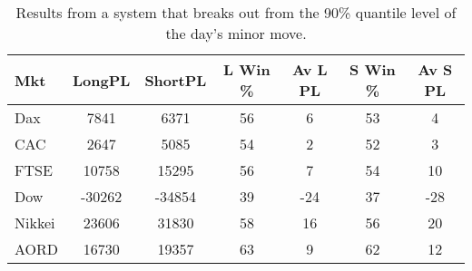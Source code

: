 \begin{table}[ht]
\centering
\caption[Results from a break out system using the day's the minor move]{Results from a system that breaks out from the 90\% quantile level of the day's minor move.} 
\label{tab:q_90_results}
\begin{tabular}{lcccccc}
  \toprule Mkt & LongPL & ShortPL & L Win \% & Av L PL & S Win \% & Av S PL \\ 
  \midrule Dax & 7841 & 6371 & 56 & 6 & 53 & 4 \\ 
  CAC & 2647 & 5085 & 54 & 2 & 52 & 3 \\ 
  FTSE & 10758 & 15295 & 56 & 7 & 54 & 10 \\ 
  Dow & -30262 & -34854 & 39 & -24 & 37 & -28 \\ 
  Nikkei & 23606 & 31830 & 58 & 16 & 56 & 20 \\ 
  AORD & 16730 & 19357 & 63 & 9 & 62 & 12 \\ 
   \bottomrule \end{tabular}
\end{table}
